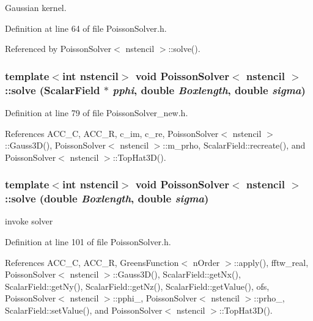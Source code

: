 Gaussian kernel. 



Definition at line 64 of file PoissonSolver.h.



Referenced by PoissonSolver$<$ nstencil $>$::solve().

\subsubsection[{solve}]{\setlength{\rightskip}{0pt plus 5cm}template$<$int nstencil$>$ void {\bf PoissonSolver}$<$ nstencil $>$::solve ({\bf ScalarField} $\ast$ {\em pphi}, \/  double {\em Boxlength}, \/  double {\em sigma})}\label{classPoissonSolver_a2582095d916f844e0b7af838536e695b}


Definition at line 79 of file PoissonSolver\_\-new.h.



References ACC\_\-C, ACC\_\-R, c\_\-im, c\_\-re, PoissonSolver$<$ nstencil $>$::Gauss3D(), PoissonSolver$<$ nstencil $>$::m\_\-prho, ScalarField::recreate(), and PoissonSolver$<$ nstencil $>$::TopHat3D().

\subsubsection[{solve}]{\setlength{\rightskip}{0pt plus 5cm}template$<$int nstencil$>$ void {\bf PoissonSolver}$<$ nstencil $>$::solve (double {\em Boxlength}, \/  double {\em sigma})}\label{classPoissonSolver_abb577e8f1d0e33f07aa330a50462dcb4}
invoke solver 

Definition at line 101 of file PoissonSolver.h.



References ACC\_\-C, ACC\_\-R, GreensFunction$<$ nOrder $>$::apply(), fftw\_\-real, PoissonSolver$<$ nstencil $>$::Gauss3D(), ScalarField::getNx(), ScalarField::getNy(), ScalarField::getNz(), ScalarField::getValue(), ofs, PoissonSolver$<$ nstencil $>$::pphi\_\-, PoissonSolver$<$ nstencil $>$::prho\_\-, ScalarField::setValue(), and PoissonSolver$<$ nstencil $>$::TopHat3D().



